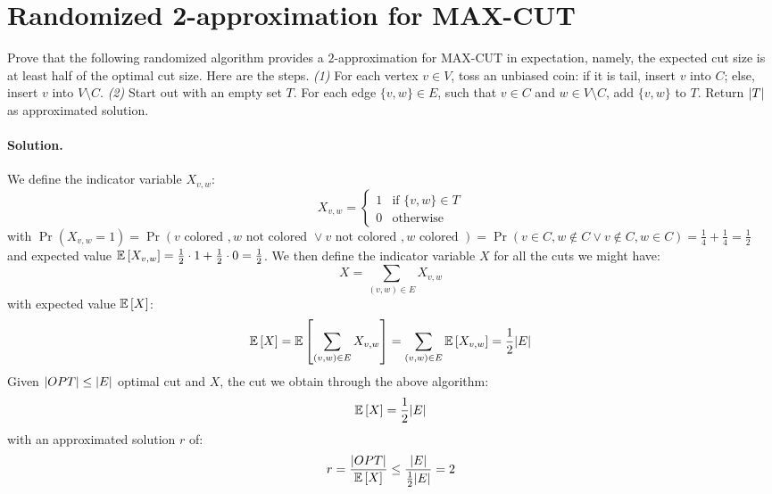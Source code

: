 \section{Randomized 2-approximation for MAX-CUT}

Prove  that  the  following  randomized algorithm provides a $2$-approximation for MAX-CUT in expectation, namely, the expected cut size is at least half of the optimal cut size.
Here are the steps.
\emph{(1)} For each vertex $v \in V$,  toss  an  unbiased  coin:  if  it  is  tail, insert $v$ into $C$; else, insert $v$ into $V \setminus C$.
\emph{(2)} Start out with an empty set $T$.
For each edge $\{v, w\} \in E$, such that $v \in C$ and $w \in V \setminus C$, add $\{v, w\}$ to $T$.
Return $\lvert T\rvert$ as approximated solution.

\vspace{0.5cm}
\paragraph{Solution.}
We define the indicator variable $X_{v, w}$:
\begin{equation*}
X_{v, w} =   \begin{cases}
1   & \text{if } \{v, w\} \in T \\
0   & \text{otherwise}
\end{cases}
\end{equation*}
with $\Pr(X_{v, w} = 1) = \Pr(v \text{ colored }, w \text{ not colored } \lor v \text{ not colored }, w \text{ colored }) = \Pr(v \in C, w \notin C \lor v \notin C, w \in C) = \frac{1}{4} + \frac{1}{4} = \frac{1}{2}$ and expected value $\mathbb{E}\left[{X_{v,w}}\right] = \frac{1}{2} \cdot 1 + \frac{1}{2} \cdot 0 = \frac{1}{2}$.
We then define the indicator variable $X$ for all the cuts we might have:
\begin{equation*}
X = \sum_{(v, w) \in E} X_{v, w}
\end{equation*}
with expected value $\mathbb{E}\left[{X}\right]$:
\begin{equation*}
\mathbb{E}\left[{X}\right] = \mathbb{E}\left[{\sum_{(v, w) \in E} X_{v, w}}\right] = \sum_{(v, w) \in E} \mathbb{E}\left[{X_{v, w}}\right] = \frac{1}{2} \lvert E\rvert
\end{equation*}
Given $\lvert OPT\rvert \leq \lvert E\rvert$ optimal cut and $X$, the cut we obtain through the above algorithm:
\begin{equation*}
\mathbb{E}\left[{X}\right] = \frac{1}{2} \lvert E\rvert
\end{equation*}
with an approximated solution $r$ of:
\begin{equation*}
r = \frac{\lvert OPT\rvert}{\mathbb{E}\left[{X}\right]} \leq \frac{\lvert E\rvert}{\frac{1}{2}\lvert E\rvert} = 2 
\end{equation*}